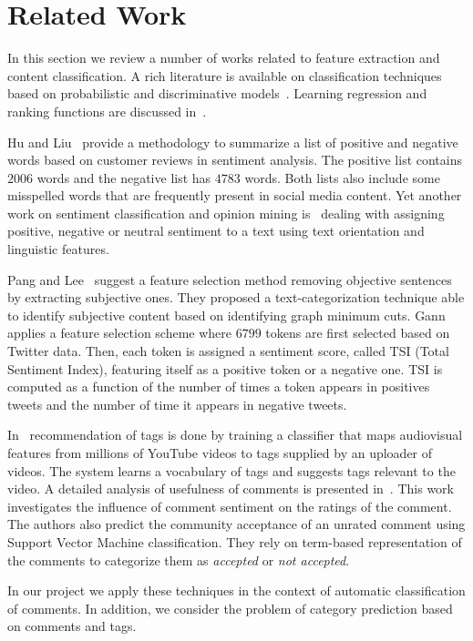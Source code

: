 \section{Related Work}
\label{sec:rel}
In this section we review a number of works related to feature extraction and content classification.
A rich literature is available on classification techniques based on probabilistic and discriminative models~\cite{Chakrabarti}.
Learning regression and ranking functions are discussed in~\cite{Smola}.

Hu and Liu~\cite{HuM} provide a methodology to summarize a list of positive and negative words based on customer reviews in sentiment analysis.
The positive list contains $2006$ words and the negative list has $4783$ words. Both lists also include some misspelled words that are frequently present in social media content.
Yet another work on sentiment classification and opinion mining is~\cite{thumbsup} dealing with assigning positive, negative or neutral sentiment to a text using text orientation and linguistic features.

Pang and Lee~\cite{PangLee} suggest a feature selection method removing objective sentences by extracting subjective ones.
They proposed a text-categorization technique able to identify subjective content based on identifying graph minimum cuts.
Gann~\cite{Gann} applies a feature selection scheme where $6799$ tokens are first selected based on Twitter data. 
Then, each token is assigned a sentiment score, called TSI (Total Sentiment Index), featuring itself as a positive token or a negative one. 
TSI is computed as a function of the number of times a token appears in positives tweets and the number of time it appears in negative tweets.

In~\cite{ tagRecCatDis} recommendation of tags is done by training a classifier that maps audiovisual features from millions of YouTube videos to tags supplied by an uploader of videos. The system learns a vocabulary of tags and suggests tags relevant to the video.
A detailed analysis of usefulness of comments is presented in~\cite{Siersdorfer:2010:UYC:1772690.1772781}. This work investigates the influence of comment sentiment on the ratings of the comment. The authors also predict the community acceptance of an unrated comment using Support Vector Machine classification. They rely on term-based representation of the comments to categorize them as \textit{accepted} or \textit{not accepted}.

In our project we apply these techniques in the context of automatic classification of comments.
In addition, we consider the problem of category prediction based on comments and tags.
